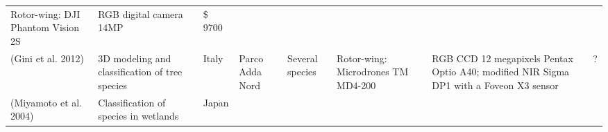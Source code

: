 \documentclass[]{interact}
\theoremstyle{plain}%
\theoremstyle{definition}
\theoremstyle{remark}
\begin{document}
\begin{longtable}[]{@{}llllllll@{}}
\begin{minipage}[t]{0.09\columnwidth}
Rotor-wing: DJI Phantom Vision 2S\strut
\end{minipage} & \begin{minipage}[t]{0.11\columnwidth}\raggedright\strut
RGB digital camera 14MP\strut
\end{minipage} & \begin{minipage}[t]{0.01\columnwidth}\raggedright\strut
\$ 9700\strut
\end{minipage}\tabularnewline
\begin{minipage}[t]{0.11\columnwidth}\raggedright\strut
(Gini et al. 2012)\strut
\end{minipage} & \begin{minipage}[t]{0.18\columnwidth}\raggedright\strut
3D modeling and classification of tree species\strut
\end{minipage} & \begin{minipage}[t]{0.03\columnwidth}\raggedright\strut
Italy\strut
\end{minipage} & \begin{minipage}[t]{0.14\columnwidth}\raggedright\strut
Parco Adda Nord\strut
\end{minipage} & \begin{minipage}[t]{0.10\columnwidth}\raggedright\strut
Several species\strut
\end{minipage} & \begin{minipage}[t]{0.09\columnwidth}\raggedright\strut
Rotor-wing: Microdrones TM MD4-200\strut
\end{minipage} & \begin{minipage}[t]{0.11\columnwidth}\raggedright\strut
RGB CCD 12 megapixels Pentax Optio A40; modified NIR Sigma DP1 with a
Foveon X3 sensor\strut
\end{minipage} & \begin{minipage}[t]{0.01\columnwidth}\raggedright\strut
?\strut
\end{minipage}\tabularnewline
\begin{minipage}[t]{0.11\columnwidth}\raggedright\strut
(Miyamoto et al. 2004)\strut
\end{minipage} & \begin{minipage}[t]{0.18\columnwidth}\raggedright\strut
Classification of species in wetlands\strut
\end{minipage} & \begin{minipage}[t]{0.03\columnwidth}\raggedright\strut
Japan\strut
\end{minipage} & \begin{minipage}[t]{0.14\columnwidth}\raggedright\strut

\end{minipage}
\end{longtable}
\end{document}
